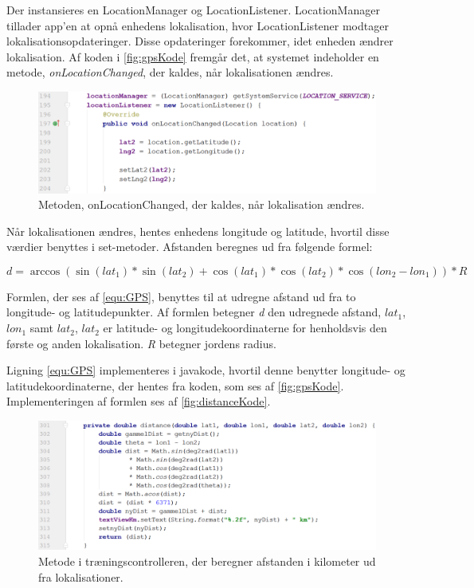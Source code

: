 Der instansieres en LocationManager og LocationListener. LocationManager tillader app'en at opnå enhedens lokalisation, hvor LocationListener modtager lokalisationsopdateringer. Disse opdateringer forekommer, idet enheden ændrer lokalisation.\cite{LocationManager, LocationListener} Af koden i \autoref{fig:gpsKode} fremgår det, at systemet indeholder en metode, \textit{onLocationChanged}, der kaldes, når lokalisationen ændres. 

\begin{figure} [H]
\centering
\includegraphics[width=1\textwidth]{figures/imple/gpsKode}
\caption{Metoden, onLocationChanged, der kaldes, når lokalisation ændres.}
\label{fig:gpsKode}
\end{figure} 

\noindent
Når lokalisationen ændres, hentes enhedens longitude og latitude, hvortil disse værdier benyttes i set-metoder. Afstanden beregnes ud fra følgende formel:

\begin{equation} \label{equ:GPS}
d = \arccos(\sin(lat_1)*\sin(lat_2)+\cos(lat_1)*\cos(lat_2)*\cos(lon_2-lon_1))*R
\end{equation}

\noindent
Formlen, der ses af \autoref{equ:GPS}, benyttes til at udregne afstand ud fra to longitude- og latitudepunkter. Af formlen betegner \textit{d} den udregnede afstand, \textit{$lat_1$}, \textit{$lon_1$} samt \textit{$lat_2$}, \textit{$lat_2$} er latitude- og longitudekoordinaterne for henholdsvis den første og anden lokalisation. \textit{R} betegner jordens radius.\cite{Deza2009}    

Ligning \ref{equ:GPS} implementeres i javakode, hvortil denne benytter longitude- og latitudekoordinaterne, der hentes fra koden, som ses af \autoref{fig:gpsKode}. Implementeringen af formlen ses af \autoref{fig:distanceKode}.

\begin{figure} [H]
\centering
\includegraphics[width=1\textwidth]{figures/imple/distanceKode}
\caption{Metode i træningscontrolleren, der beregner afstanden i kilometer ud fra lokalisationer.}
\label{fig:distanceKode}
\end{figure}
 
